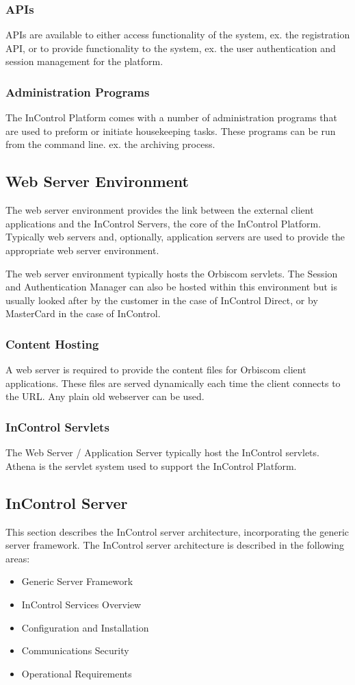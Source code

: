 \documentclass[a4paper, 11pt, titlepage]{article}
\begin{document}
\subsubsection{APIs} APIs are available to either access functionality of the system, ex. the registration API, or to provide functionality to the system, ex. the user authentication and session management for the platform. 
\subsubsection{Administration Programs} The InControl Platform comes with a number of administration programs that are used to preform or initiate housekeeping tasks. These programs can be run from the command line. ex. the archiving process. 
 
\subsection{Web Server Environment}
The web server environment provides the link between the external client applications and the InControl Servers, the core of the InControl Platform. Typically web servers and, optionally, application servers are used to provide the appropriate web server environment. 
 
The web server environment typically hosts the Orbiscom servlets. The Session and Authentication Manager can also be hosted within this environment but is usually looked after by the customer in the case of InControl Direct, or by MasterCard in the case of InControl. 
 
\subsubsection{Content Hosting} 
A web server is required to provide the content files for Orbiscom client applications. These files are served dynamically each time the client connects to the URL. Any plain old webserver can be used. 
\subsubsection{InControl Servlets}  
The Web Server / Application Server typically host the InControl servlets. Athena is the servlet system used to support the InControl Platform. 
 
\subsection{InControl Server} 
This section describes the InControl server architecture, incorporating the generic server framework. The InControl server architecture is described in the following areas: 
\begin{itemize} 
\item Generic Server Framework 
\item InControl Services Overview 
\item Configuration and Installation 
\item Communications Security 
\item Operational Requirements 
\end{itemize} 
 
\end{document}
